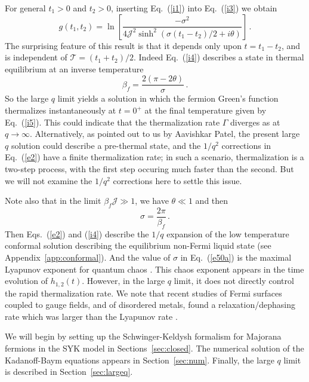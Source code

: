 \documentclass[prx,aps,onecolumn,amsfonts,showpacs,superscriptaddress,preprint,eqsecnum]
{revtex4-1}
\newcommand{\beq}{\begin{equation}}
\newcommand{\eeq}{\end{equation}}
\begin{document}
For general $t_1>0$ and $t_2 > 0$, inserting Eq.~(\ref{i1}) into Eq.~(\ref{i3}) we obtain
\beq
g(t_1, t_2 ) = \ln \left[ \frac{- \sigma^2}{4 \mathcal{J}^2 \sinh^2 (\sigma (t_1- t_2)/2 + i \theta)} \right] \,. \label{i4}
\eeq
The surprising feature of this result is that it depends only upon $t=t_1-t_2$, 
and is independent of $\mathcal{T} = (t_1 + t_2)/2$. Indeed Eq.~(\ref{i4}) describes a state in thermal
equilibrium \cite{PG98,Maldacena2016} at an inverse temperature
\beq
\beta_f = \frac{2 (\pi - 2 \theta)}{\sigma} \,. \label{i5}
\eeq
So the large $q$ limit yields a solution in which the fermion Green's function thermalizes instantaneously at $t=0^+$
at the final temperature given by Eq.~(\ref{i5}). 
This could indicate that the 
thermalization rate $\Gamma$ diverges as
at $q \rightarrow \infty$. Alternatively, as pointed out
to us by Aavishkar Patel, the present large $q$ solution
could describe a pre-thermal state, and the $1/q^2$ 
corrections in Eq.~(\ref{e2}) have a finite thermalization rate; in such a scenario, 
thermalization is a two-step process, with the first step occuring much faster than the second. 
But we will not examine the $1/q^2$ corrections here
to settle this issue.

Note also that in the limit $\beta_f \mathcal{J} \gg 1$, we have $\theta \ll 1$ and then
\beq
\sigma = \frac{2 \pi}{\beta_f}\,. \label{e50a}
\eeq
Then Eqs.~(\ref{e2}) and (\ref{i4}) describe the $1/q$ expansion of the low temperature conformal solution \cite{PG98} describing the equilibrium non-Fermi liquid state (see Appendix~\ref{app:conformal}).
And the value of $\sigma$ in Eq.~(\ref{e50a}) is
the maximal Lyapunov exponent for quantum chaos \cite{Maldacena2016a}. This chaos exponent appears in the time evolution 
of $h_{1,2} (t)$. However, in the large $q$ limit, it does not directly control the rapid thermalization rate. We note that recent studies of 
Fermi surfaces coupled to gauge fields, and of disordered metals, found a relaxation/dephasing rate which was larger than the Lyapunov rate \cite{PS17,PCSS17}.

We will begin by setting up the Schwinger-Keldysh formalism for Majorana fermions in the SYK model in Sections~\ref{sec:closed}.
The numerical solution of the Kadanoff-Baym equations
appears in Section~\ref{sec:num}. Finally, the large $q$ limit is described in Section~\ref{sec:largeq}.
\end{document}
